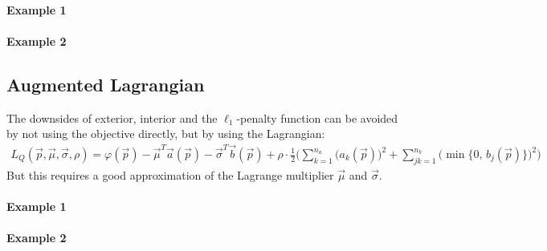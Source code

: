 			\paragraph{Example 1} %

			\paragraph{Example 2} %

		\subsection{Augmented Lagrangian}
			The downsides of exterior, interior and the \(\ell_1\)-penalty function can be avoided by not using the objective directly, but by using the Lagrangian:
			\begin{align*}
				L_Q(\vec{p}, \vec{\mu}, \vec{\sigma}, \rho) = \varphi(\vec{p}) - \vec{\mu}^T \vec{a}(\vec{p}) - \vec{\sigma}^T \vec{b}(\vec{p}) + \rho \cdot \frac{1}{2} \Bigg( \sum_{k = 1}^{n_a} \big(a_k(\vec{p})\big)^2 + \sum_{jk = 1}^{n_b} \big( \min\{ 0,\, b_j(\vec{p}) \} \big)^2 \Bigg)
			\end{align*}
			But this requires a good approximation of the Lagrange multiplier \( \vec{\mu} \) and \( \vec{\sigma} \).

			\paragraph{Example 1} %

			\paragraph{Example 2} %

